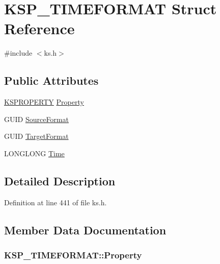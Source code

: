 \hypertarget{struct_k_s_p___t_i_m_e_f_o_r_m_a_t}{}\section{K\+S\+P\+\_\+\+T\+I\+M\+E\+F\+O\+R\+M\+AT Struct Reference}
\label{struct_k_s_p___t_i_m_e_f_o_r_m_a_t}


{\ttfamily \#include $<$ks.\+h$>$}

\subsection*{Public Attributes}
\begin{DoxyCompactItemize}
\item 
\hyperlink{ks_8h_a4392f77c74e868d813d46c39ada4d660}{K\+S\+P\+R\+O\+P\+E\+R\+TY} \hyperlink{struct_k_s_p___t_i_m_e_f_o_r_m_a_t_ae3301052a532d98ac61e13fc19010d68}{Property}
\item 
G\+U\+ID \hyperlink{struct_k_s_p___t_i_m_e_f_o_r_m_a_t_af7fca0d5afc6d890295e36753e5e386c}{Source\+Format}
\item 
G\+U\+ID \hyperlink{struct_k_s_p___t_i_m_e_f_o_r_m_a_t_a6ec0ce402b19025bbc62013c9403e1b5}{Target\+Format}
\item 
L\+O\+N\+G\+L\+O\+NG \hyperlink{struct_k_s_p___t_i_m_e_f_o_r_m_a_t_a189ecd34871a3d0930ceb4a81b2605e0}{Time}
\end{DoxyCompactItemize}


\subsection{Detailed Description}


Definition at line 441 of file ks.\+h.



\subsection{Member Data Documentation}
\subsubsection[{\texorpdfstring{Property}{Property}}]{ K\+S\+P\+\_\+\+T\+I\+M\+E\+F\+O\+R\+M\+A\+T\+::\+Property}\hypertarget{struct_k_s_p___t_i_m_e_f_o_r_m_a_t_ae3301052a532d98ac61e13fc19010d68}{}\label{struct_k_s_p___t_i_m_e_f_o_r_m_a_t_ae3301052a532d98ac61e13fc19010d68}


